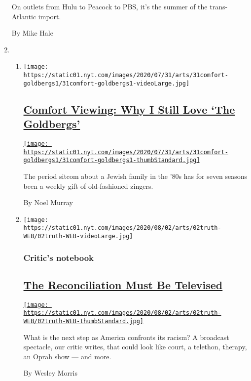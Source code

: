 \begin{enumerate}
  On outlets from Hulu to Peacock to PBS, it's the summer of the
  trans-Atlantic import.

  By Mike Hale
\item
  \begin{enumerate}
  \def\labelenumii{\arabic{enumii}.}
  \item
    \texttt{[image: https://static01.nyt.com/images/2020/07/31/arts/31comfort-goldbergs1/31comfort-goldbergs1-videoLarge.jpg]}

    \hypertarget{comfort-viewing-why-i-still-love-the-goldbergs}{%
    \subsection{\texorpdfstring{\href{/2020/07/31/arts/television/goldbergs-abc-stream.html}{Comfort
    Viewing: Why I Still Love `The
    Goldbergs'}}{Comfort Viewing: Why I Still Love `The Goldbergs'}}\label{comfort-viewing-why-i-still-love-the-goldbergs}}

    \href{/2020/07/31/arts/television/goldbergs-abc-stream.html}{\texttt{[image: https://static01.nyt.com/images/2020/07/31/arts/31comfort-goldbergs1/31comfort-goldbergs1-thumbStandard.jpg]}}

    The period sitcom about a Jewish family in the '80s has for seven
    seasons been a weekly gift of old-fashioned zingers.

    By Noel Murray
  \item
    \texttt{[image: https://static01.nyt.com/images/2020/08/02/arts/02truth-WEB/02truth-WEB-videoLarge.jpg]}

    \hypertarget{critics-notebook-2}{%
    \subsubsection{Critic's notebook}\label{critics-notebook-2}}

    \hypertarget{the-reconciliation-must-be-televised}{%
    \subsection{\texorpdfstring{\href{/2020/07/30/arts/television/the-moment-racism-tv.html}{The
    Reconciliation Must Be
    Televised}}{The Reconciliation Must Be Televised}}\label{the-reconciliation-must-be-televised}}

    \href{/2020/07/30/arts/television/the-moment-racism-tv.html}{\texttt{[image: https://static01.nyt.com/images/2020/08/02/arts/02truth-WEB/02truth-WEB-thumbStandard.jpg]}}

    What is the next step as America confronts its racism? A broadcast
    spectacle, our critic writes, that could look like court, a
    telethon, therapy, an Oprah show --- and more.

    By Wesley Morris
  \end{enumerate}
\end{enumerate}

